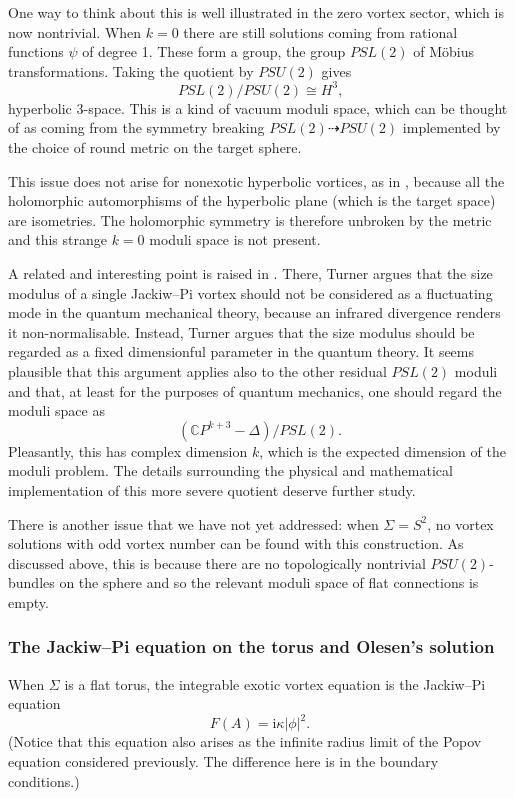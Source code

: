 \documentclass[10pt]{article}
\newcommand{\ii}{\text{i}}
\theoremstyle{definition}
\begin{document}
One way to think about this is well illustrated in the zero vortex sector, which is now nontrivial. When \(k=0\) there are still solutions coming from rational functions \(\psi\) of degree 1. These form a group, the group \(PSL(2)\) of M\"obius transformations. Taking the quotient by \(PSU(2)\) gives 
\[
PSL(2)/PSU(2) \cong H^3 \text{,}
\]
hyperbolic 3-space. This is a kind of vacuum moduli space, which can be thought of as coming from the symmetry breaking \(PSL(2) \dashrightarrow PSU(2)\) implemented by the choice of round metric on the target sphere. 

This issue does not arise for nonexotic hyperbolic vortices, as in \cite{wittenMPS}, because all the holomorphic automorphisms of the hyperbolic plane (which is the target space) are isometries. The holomorphic symmetry is therefore unbroken by the metric and this strange \(k=0\) moduli space is not present.

A related and interesting point is raised in \cite{turnerQO}. There, Turner argues that the size modulus of a single Jackiw--Pi vortex should not be considered as a fluctuating mode in the quantum mechanical theory, because an infrared divergence renders it non-normalisable. Instead, Turner argues that the size modulus should be regarded as a fixed dimensionful parameter in the quantum theory. It seems plausible that this argument applies also to the other residual \(PSL(2)\) moduli and that, at least for the purposes of quantum mechanics, one should regard the moduli space as
\[
\left( \mathbb{C}P^{k+3}-\Delta \right)/PSL(2)\text{.}
\]
Pleasantly, this has complex dimension \(k\), which is the expected dimension of the moduli problem. The details surrounding the physical and mathematical implementation of this more severe quotient deserve further study. 


There is another issue that we have not yet addressed: when \(\Sigma = S^2\), no vortex solutions with odd vortex number can be found with this construction. As discussed above, this is because there are no topologically nontrivial \(PSU(2)\)-bundles on the sphere and so the relevant moduli space of flat connections is empty.

\subsubsection{The Jackiw--Pi equation on the torus and Olesen's solution}

When \(\Sigma \) is a flat torus, the integrable exotic vortex equation is the Jackiw--Pi equation \cite{jackiwSSS}
\[
F(A) = \ii \kappa |\phi|^2 \text{.} 
\]
(Notice that this equation also arises as the infinite radius limit of the Popov equation considered previously. The difference here is in the boundary conditions.)
\end{document}
